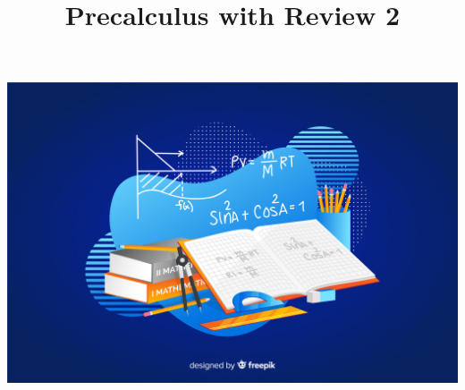 \documentclass[handout]{xourse}
\title{Precalculus with Review 2}
\begin{document}
\includegraphics[width=\textwidth]{2339356.jpg}
\maketitle


	
\end{document}
